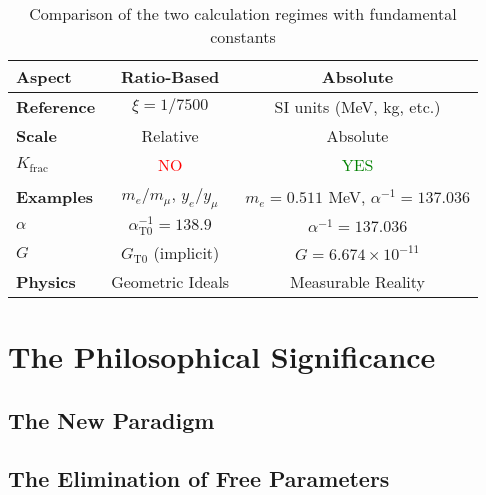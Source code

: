 \documentclass[12pt,a4paper]{article}
\begin{document}
	\begin{table}[h]
		\centering
		\begin{tabular}{lcc}
			\toprule
			\textbf{Aspect} & \textbf{Ratio-Based} & \textbf{Absolute} \\
			\midrule
			\textbf{Reference} & $\xi = 1/7500$ & SI units (MeV, kg, etc.) \\
			\textbf{Scale} & Relative & Absolute \\
			\textbf{$K_{\text{frac}}$} & \textcolor{red}{NO} & \textcolor{green}{YES} \\
			\textbf{Examples} & $m_e/m_μ$, $y_e/y_μ$ & $m_e = 0.511$ MeV, $\alpha^{-1} = 137.036$ \\
			\textbf{$\alpha$} & $\alpha_{\text{T0}}^{-1} = 138.9$ & $\alpha^{-1} = 137.036$ \\
			\textbf{$G$} & $G_{\text{T0}}$ (implicit) & $G = 6.674\times10^{-11}$ \\
			\textbf{Physics} & Geometric Ideals & Measurable Reality \\
			\bottomrule
		\end{tabular}
		\caption{Comparison of the two calculation regimes with fundamental constants}
	\end{table}
	
	\section{The Philosophical Significance}
	
	\subsection{The New Paradigm}
	
	\begin{center}
	\end{center}
	
	\subsection{The Elimination of Free Parameters}
	
\end{document}
